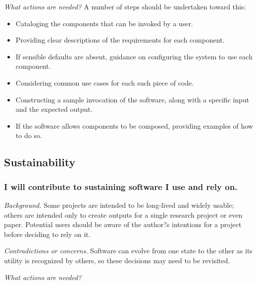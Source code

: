 \documentclass[a4paper,UKenglish]{dagman}
\newcommand{\onhere}{\yellowbox{$\Rightarrow$ OSCAR: CONTINUE HERE $\Leftarrow$}}
\renewcommand{\paragraph}[1]{\subsubsection*{#1}\xspace}
\begin{document}

\emph{What actions are needed?}
A number of steps should be undertaken toward this:
\begin{itemize}
\item Cataloging the components that can be invoked by a user.
\item Providing clear descriptions of the requirements for each component.
\item If sensible defaults are absent, guidance on configuring the system to use each component.
\item Considering common use cases for each such piece of code.
\item Constructing a sample invocation of the software, along with a specific input and the expected output.
\item If the software allows components to be composed, providing examples of how to do so.
\end{itemize}

\subsection{Sustainability}


\onhere

\paragraph{I will contribute to sustaining software I use and rely on.}




\emph{Background.} Some projects are intended to be long-lived and widely usable; others are intended only to create outputs for a single research project or even paper. Potential users should be aware of the author?s intentions for a project before deciding to rely on it.  

\emph{Contradictions or concerns.} Software can evolve from one state to the other as its utility is recognized by others, so these decisions may need to be revisited. 


\emph{What actions are needed?}
\end{document}
